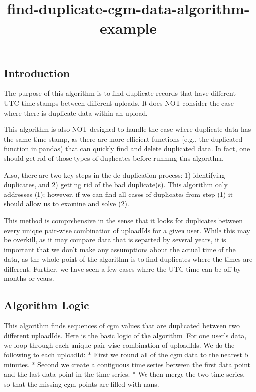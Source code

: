 \documentclass[11pt]{article}
\title{find-duplicate-cgm-data-algorithm-example}
\begin{document}
    
    
    \maketitle
    
    

    
    \hypertarget{introduction}{%
\subsection{Introduction}\label{introduction}}

The purpose of this algorithm is to find duplicate records that have
different UTC time stamps between different uploads. It does NOT
consider the case where there is duplicate data within an upload.

This algorithm is also NOT designed to handle the case where duplicate
data has the same time stamp, as there are more efficient functions
(e.g., the duplicated function in pandas) that can quickly find and
delete duplicated data. In fact, one should get rid of those types of
duplicates before running this algorithm.

Also, there are two key steps in the de-duplication process: 1)
identifying duplicates, and 2) getting rid of the bad duplicate(s). This
algorithm only addresses (1); however, if we can find all cases of
duplicates from step (1) it should allow us to examine and solve (2).

This method is comprehensive in the sense that it looks for duplicates
between every unique pair-wise combination of uploadIds for a given
user. While this may be overkill, as it may compare data that is
separted by several years, it is important that we don't make any
assumptions about the actual time of the data, as the whole point of the
algorithm is to find duplicates where the times are different. Further,
we have seen a few cases where the UTC time can be off by months or
years.

\hypertarget{algorithm-logic}{%
\subsection{Algorithm Logic}\label{algorithm-logic}}

This algorithm finds sequences of cgm values that are duplicated between
two different uploadIds. Here is the basic logic of the algorithm. For
one user's data, we loop through each unique pair-wise combination of
uploadIds. We do the following to each uploadId: * First we round all of
the cgm data to the nearest 5 minutes. * Second we create a contiguous
time series between the first data point and the last data point in the
time series. * We then merge the two time series, so that the missing
cgm points are filled with nans.
\end{document}
